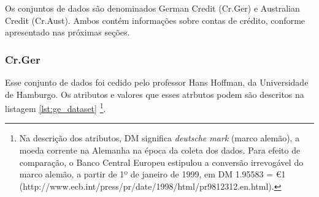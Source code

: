 Os conjuntos de dados são denominados German Credit (Cr.Ger) e Australian Credit (Cr.Aust). Ambos contém informações sobre contas de crédito, conforme apresentado nas próximas seções.

\subsubsection{Cr.Ger}

Esse conjunto de dados foi cedido pelo professor Hans Hoffman, da Universidade de Hamburgo. Os atributos e valores que esses atrbutos podem são descritos na listagem \ref{lst:ge_dataset} \footnote{Na descrição dos atributos, DM significa \emph{deutsche mark} (marco alemão), a moeda corrente na Alemanha na época da coleta dos dados. Para efeito de comparação, o Banco Central Europeu estipulou a conversão irrevogável do marco alemão, a partir de 1º de janeiro de 1999, em DM 1.95583 = \euro 1 (http://www.ecb.int/press/pr/date/1998/html/pr981231\textunderscore2.en.html).}.

